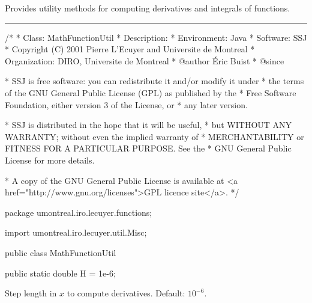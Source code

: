 
Provides utility methods for computing
derivatives and integrals of functions.

\bigskip\hrule

\begin{code}
\begin{hide}
/*
 * Class:        MathFunctionUtil
 * Description:
 * Environment:  Java
 * Software:     SSJ
 * Copyright (C) 2001  Pierre L'Ecuyer and Universite de Montreal
 * Organization: DIRO, Universite de Montreal
 * @author       Éric Buist
 * @since

 * SSJ is free software: you can redistribute it and/or modify it under
 * the terms of the GNU General Public License (GPL) as published by the
 * Free Software Foundation, either version 3 of the License, or
 * any later version.

 * SSJ is distributed in the hope that it will be useful,
 * but WITHOUT ANY WARRANTY; without even the implied warranty of
 * MERCHANTABILITY or FITNESS FOR A PARTICULAR PURPOSE.  See the
 * GNU General Public License for more details.

 * A copy of the GNU General Public License is available at
   <a href="http://www.gnu.org/licenses">GPL licence site</a>.
 */
\end{hide}
package umontreal.iro.lecuyer.functions;\begin{hide}

import umontreal.iro.lecuyer.util.Misc;
\end{hide}

public class MathFunctionUtil\begin{hide} {
\end{hide}

   public static double H = 1e-6;
\end{code}
\begin{tabb} Step length in $x$ to compute derivatives. Default: $10^{-6}$.
\end{tabb}
